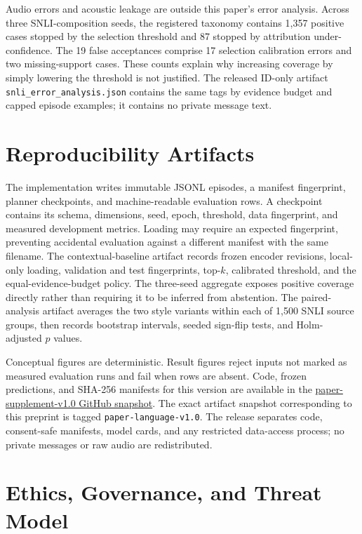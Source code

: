 \documentclass[11pt,a4paper]{article}
\begin{document}
Audio errors and acoustic leakage are outside this paper's error analysis.
Across three SNLI-composition seeds, the registered taxonomy contains 1,357
positive cases stopped by the selection threshold and 87 stopped by
attribution under-confidence.  The 19 false acceptances comprise 17 selection
calibration errors and two missing-support cases.  These counts explain why
increasing coverage by simply lowering the threshold is not justified.
The released ID-only artifact \texttt{snli\_error\_analysis.json} contains
the same tags by evidence budget and capped episode examples; it contains no
private message text.

\section{Reproducibility Artifacts}

The implementation writes immutable JSONL episodes, a manifest fingerprint,
planner checkpoints, and machine-readable evaluation rows.  A checkpoint
contains its schema, dimensions, seed, epoch, threshold, data fingerprint, and
measured development metrics.  Loading may require an expected fingerprint,
preventing accidental evaluation against a different manifest with the same
filename.
The contextual-baseline artifact records frozen encoder revisions, local-only
loading, validation and test fingerprints, top-$k$, calibrated threshold, and
the equal-evidence-budget policy.  The three-seed aggregate exposes positive
coverage directly rather than requiring it to be inferred from abstention.
The paired-analysis artifact averages the two style variants within each of
1,500 SNLI source groups, then records bootstrap intervals, seeded sign-flip
tests, and Holm-adjusted $p$ values.

Conceptual figures are deterministic.  Result figures reject inputs not marked
as measured evaluation runs and fail when rows are absent.  Code, frozen
predictions, and SHA-256 manifests for this version are available in the
\href{https://github.com/FinalSunFlower/PersonaVoice/tree/paper-supplement-v1.0}{paper-supplement-v1.0 GitHub snapshot}.
The exact artifact snapshot corresponding to this preprint is tagged
\texttt{paper-language-v1.0}.  The release separates code, consent-safe
manifests, model cards, and any restricted data-access process; no private
messages or raw audio are redistributed.

\section{Ethics, Governance, and Threat Model}
\end{document}
